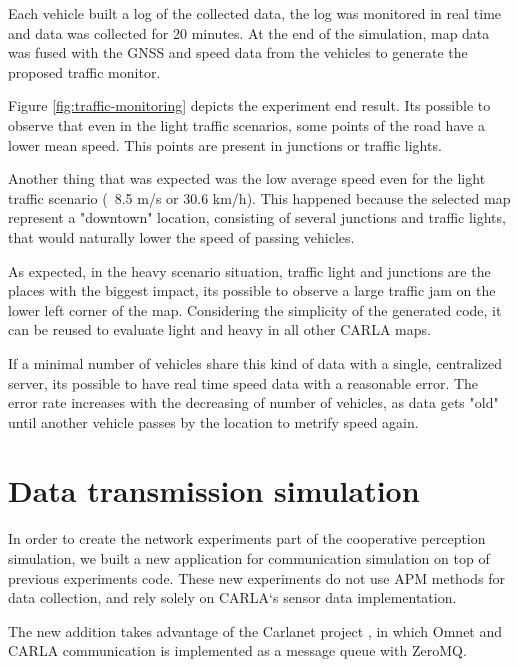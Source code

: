 Each vehicle built a log of the collected data, the log was monitored in real time and data was collected for 20 minutes. At the end of the simulation, map data was fused with the GNSS and speed data from the vehicles to generate the proposed traffic monitor.

Figure \ref{fig:traffic-monitoring} depicts the experiment end result. Its possible to observe that even in the light traffic scenarios, some points of the road have a lower mean speed. This points are present in junctions or traffic lights.

Another thing that was expected was the low average speed even for the light traffic scenario (~8.5 m/s or 30.6 km/h). This happened because the selected map represent a "downtown" location, consisting of several junctions and traffic lights, that would naturally lower the speed of passing vehicles.

As expected, in the heavy scenario situation, traffic light and junctions are the places with the biggest impact, its possible to observe a large traffic jam on the lower left corner of the map. Considering the simplicity of the generated code, it can be reused to evaluate light and heavy in all other CARLA maps.

If a minimal number of vehicles share this kind of data with a single, centralized server, its possible to have real time speed data with a reasonable error. The error rate increases with the decreasing of number of vehicles, as data gets "old" until another vehicle passes by the location to metrify speed again.

\section{Data transmission simulation}

In order to create the network experiments part of the cooperative perception simulation, we built a new application for communication simulation on top of previous experiments code. These new experiments do not use APM methods for data collection, and rely solely on CARLA`s sensor data implementation.

The new addition takes advantage of the Carlanet project \cite{cislaghi2023simulation}, in which Omnet and CARLA communication is implemented as a message queue with ZeroMQ.

